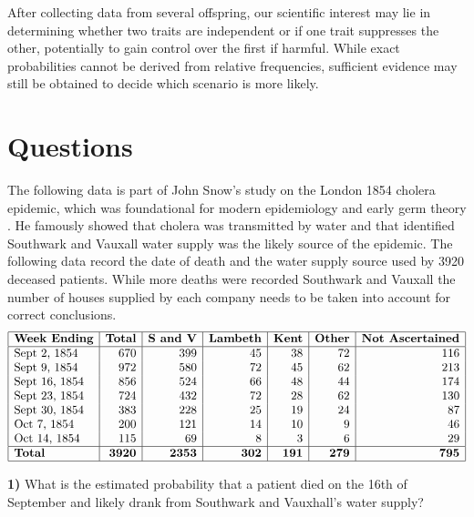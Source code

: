 \documentclass[
]{book}
\begin{document}
After collecting data from several offspring, our scientific interest may lie in determining whether two traits are independent or if one trait suppresses the other, potentially to gain control over the first if harmful. While exact probabilities cannot be derived from relative frequencies, sufficient evidence may still be obtained to decide which scenario is more likely.

\hypertarget{questions-1}{%
\section{Questions}\label{questions-1}}

The following data is part of John Snow's study on the London 1854 cholera epidemic, which was foundational for modern epidemiology and early germ theory \citep{snow1855mode}. He famously showed that cholera was transmitted by water and that identified Southwark and Vauxall water supply was the likely source of the epidemic. The following data record the date of death and the water supply source used by 3920 deceased patients. While more deaths were recorded Southwark and Vauxall the number of houses supplied by each company needs to be taken into account for correct conclusions.\\
\[
\begin{array}{|l|r|r|r|r|r|r|}
\hline
\textbf{Week Ending} & \textbf{Total} & \textbf{S and V} & \textbf{Lambeth} & \textbf{Kent} & \textbf{Other} & \textbf{Not Ascertained} \\
\hline
\text{Sept 2, 1854}  & 670 & 399 & 45  & 38  & 72 & 116 \\
\text{Sept 9, 1854}  & 972 & 580 & 72  & 45  & 62 & 213 \\
\text{Sept 16, 1854} & 856 & 524 & 66  & 48  & 44 & 174 \\
\text{Sept 23, 1854} & 724 & 432 & 72  & 28  & 62 & 130 \\
\text{Sept 30, 1854} & 383 & 228 & 25  & 19  & 24 &  87 \\
\text{Oct 7, 1854}   & 200 & 121 & 14  & 10  & 9  &  46 \\
\text{Oct 14, 1854}  & 115 &  69 & 8   & 3   & 6  &  29 \\
\hline
\textbf{Total}       & \textbf{3920} & \textbf{2353} & \textbf{302} & \textbf{191} & \textbf{279} & \textbf{795} \\
\hline
\end{array}
\]

\textbf{1)} What is the estimated probability that a patient died on the 16th of September and likely drank from Southwark and Vauxhall's water supply?
\end{document}
